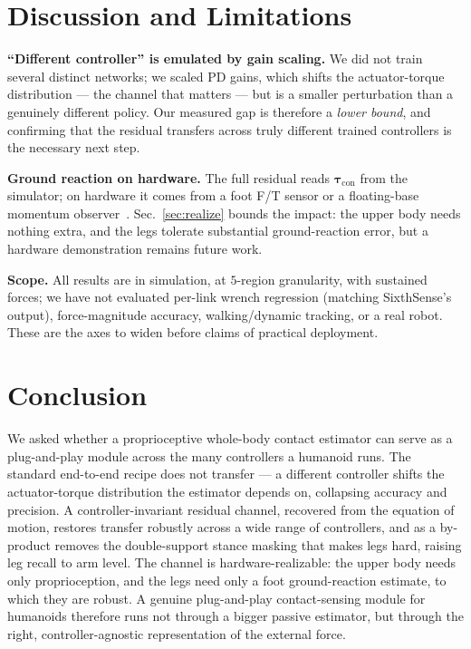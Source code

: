 \documentclass[conference]{IEEEtran}
\begin{document}
\section{Discussion and Limitations}
\label{sec:limits}
\textbf{``Different controller'' is emulated by gain scaling.} We did not train
several distinct networks; we scaled PD gains, which shifts the actuator-torque
distribution --- the channel that matters --- but is a smaller perturbation than a
genuinely different policy. Our measured gap is therefore a \emph{lower bound},
and confirming that the residual transfers across truly different trained
controllers is the necessary next step.

\textbf{Ground reaction on hardware.} The full residual reads
$\boldsymbol{\tau}_{\mathrm{con}}$ from the simulator; on hardware it comes from a
foot F/T sensor or a floating-base momentum
observer~\cite{deluca2006momentum,mobnet}. Sec.~\ref{sec:realize} bounds the
impact: the upper body needs nothing extra, and the legs tolerate substantial
ground-reaction error, but a hardware demonstration remains future work.

\textbf{Scope.} All results are in simulation, at $5$-region granularity, with
sustained forces; we have not evaluated per-link wrench regression (matching
SixthSense's output), force-magnitude accuracy, walking/dynamic tracking, or a
real robot. These are the axes to widen before claims of practical deployment.

\section{Conclusion}
We asked whether a proprioceptive whole-body contact estimator can serve as a
plug-and-play module across the many controllers a humanoid runs. The standard
end-to-end recipe does not transfer --- a different controller shifts the
actuator-torque distribution the estimator depends on, collapsing accuracy and
precision. A controller-invariant residual channel, recovered from the equation of
motion, restores transfer robustly across a wide range of controllers, and as a
by-product removes the double-support stance masking that makes legs hard, raising
leg recall to arm level. The channel is hardware-realizable: the upper body needs
only proprioception, and the legs need only a foot ground-reaction estimate, to
which they are robust. A genuine plug-and-play contact-sensing module for
humanoids therefore runs not through a bigger passive estimator, but through the
right, controller-agnostic representation of the external force.



\end{document}
